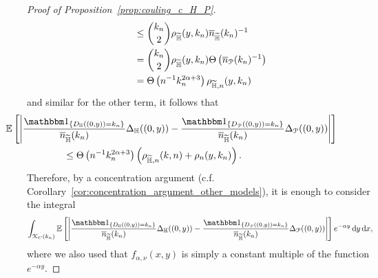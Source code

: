 \begin{proof}[Proof of Proposition~\ref{prop:couling_c_H_P}]
\begin{align*}
	&\le \binom{k_n}{2} \rho_{\widetilde{\mathbb{H}}}(y,k_n)\overline{n}_{\widetilde{\mathbb{H}}}(k_n)^{-1} \\
	&= \binom{k_n}{2} \rho_{\widetilde{\mathbb{H}}}(y,k_n)\Theta\left(\overline{n}_{{\mathcal P}}(k_n)^{-1}\right)\\
	&= \Theta\left(n^{-1} k_n^{2\alpha + 3}\right)\rho_{\widetilde{\mathbb{H}},n}(y,k_n)
\end{align*}
and similar for the other term, it follows that
\begin{align*}
	&\hspace{-60pt}\Exp{ \left| \frac{\ind{D_\H((0,y)) = k_n}}{\expH} \Delta_\H ((0,y) )
		- \frac{\ind{D_\Pcal((0,y)) = k_n}}{\expH}  \Delta_\Pcal ((0,y))\right|} \\
	&\le \bigT{n^{-1} k_n^{2\alpha + 3}}\left(\rho_{\HP,n}(k,n) + \rho_n(y,k_n)\right).
\end{align*}
Therefore, by a concentration argument (c.f. Corollary~\ref{cor:concentration_argument_other_models}), it is enough to consider the integral
\begin{equation} \label{eq:expectation_total}
	\int_{\Kcal_{C}(k_n)} \Exp{\left|\frac{\ind{D_\H((0,y)) = k_n}}{\expH} \Delta_\H ((0,y) ) 
		- \frac{\ind{D_\Pcal((0,y)) = k_n}}{\expH} \Delta_\Pcal ((0,y))\right|} e^{-\alpha y} \dd y \dd x,
\end{equation}
where we also used that $f_{\alpha,\nu}(x,y)$ is simply a constant multiple of the function $e^{-\alpha y}$.


\end{proof}
